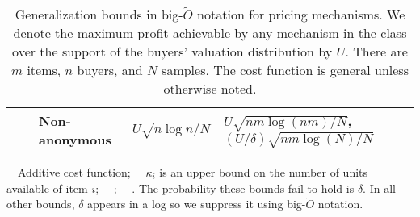 \begin{table}
\begin{tabularx}{\textwidth}{L{0.55} L{1} L{0.8} L{1.25} L{1.4}}
		& & Non-anonymous& $U\sqrt{n \log n/N}$ & $U\sqrt{nm \log (nm)/N}$\footnotemark[4], $\left(U/\delta\right)\sqrt{nm\log \left(N\right)/N}$\footnotemark[2]\\\bottomrule
	\end{tabularx}
	\noindent\par
	{\center
		\scriptsize
		\footnotemark[1]~~{Additive cost function};\quad
		\footnotemark[3]~~{$\kappa_i$ is an upper bound on the number of units available of item $i$};\quad
		\footnotemark[4]~~{\citet{Morgenstern16:Learning}};\quad
		\footnotemark[2]~~{\citet{Syrgkanis17:Sample}. The probability these bounds fail to hold is $\delta$. In all other bounds, $\delta$ appears in a log so we suppress it using big-$\tilde O$ notation.}
	}
	
	\caption{Generalization bounds in big-$\tilde O$ notation for pricing mechanisms. We denote the maximum profit achievable by any mechanism in the class over the support of the buyers' valuation distribution by $U$. There are $m$ items, $n$ buyers, and $N$ samples. The cost function is general unless otherwise noted.}\label{tab:results_pricing}
\end{table}
